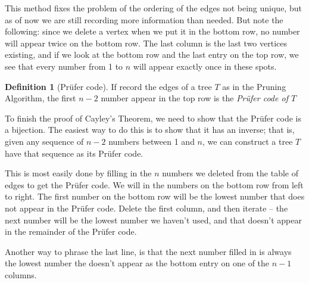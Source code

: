 \documentclass[10pt,]{book}
\theoremstyle{plain}
\theoremstyle{definition}
\newtheorem{definition}[theorem]{Definition}
\theoremstyle{definition}
\theoremstyle{definition}
\theoremstyle{definition}
\numberwithin{equation}{section}
\begin{document}
\hypertarget{p-233}{}%
This method fixes the problem of the ordering of the edges not being unique, but as of now we are still recording more information than needed.  But note the following: since we delete a vertex when we put it in the bottom row, no number will appear twice on the bottom row.  The last column is the last two vertices existing, and if we look at the bottom row and the last entry on the top row, we see that every number from 1 to \(n\) will appear exactly once in these spots.%
\begin{definition}[{Prüfer code}]\label{definition-19}
\hypertarget{p-234}{}%
If record the edges of a tree \(T\) as in the Pruning Algorithm, the first \(n-2\) number appear in the top row is the \emph{Prüfer code of \(T\)}%
\end{definition}
\hypertarget{p-235}{}%
To finish the proof of Cayley's Theorem, we need to show that the Prüfer code is a bijection.  The easiest way to do this is to show that it has an inverse; that is, given any sequence of \(n-2\) numbers between 1 and \(n\), we can construct a tree \(T\) have that sequence as its Prüfer code.%
\par
\hypertarget{p-236}{}%
This is most easily done by filling in the \(n\) numbers we deleted from the table of edges to get the Prüfer code.  We will in the numbers on the bottom row from left to right.  The first number on the bottom row will be the lowest number that does not appear in the Prüfer code.  Delete the first column, and then iterate -- the next number will be the lowest number we haven't used, and that doesn't appear in the remainder of the Prüfer code.%
\par
\hypertarget{p-237}{}%
Another way to phrase the last line, is that the next number filled in is always the lowest number the doesn't appear as the bottom entry on one of the \(n-1\) columns.%
\end{document}
